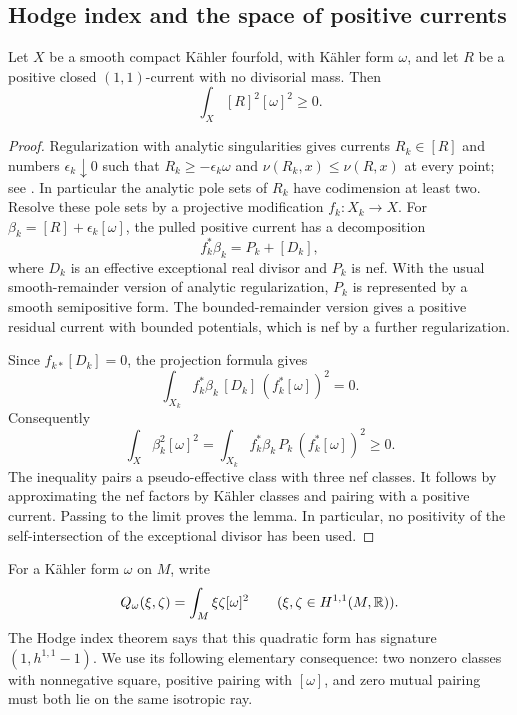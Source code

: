 \subsection{Hodge index and the space of positive currents}

\begin{lemma}\label{fol:nonnegative-square}
Let $X$ be a smooth compact K\"ahler fourfold, with K\"ahler form
$\omega$, and let $R$ be a positive closed $(1,1)$-current with no
divisorial mass.  Then
\[
 \int_X [R]^2[\omega]^2\geq0.
\]
\end{lemma}

\begin{proof}
Regularization with analytic singularities gives currents
$R_k\in[R]$ and numbers $\epsilon_k\downarrow0$ such that
$R_k\geq-\epsilon_k\omega$ and
$\nu(R_k,x)\leq\nu(R,x)$ at every point; see
\cite[Theorem~2.1(ii)]{BoucksomDivisorialZariski}.
In particular the analytic pole sets of $R_k$ have codimension at least
two.  Resolve these pole sets by a projective modification
$f_k\colon X_k\to X$.  For
$\beta_k=[R]+\epsilon_k[\omega]$, the pulled positive current has a
decomposition
\[
 f_k^*\beta_k=P_k+[D_k],
\]
where $D_k$ is an effective exceptional real divisor and $P_k$ is nef.
With the usual smooth-remainder version of analytic regularization,
$P_k$ is represented by a smooth semipositive form.  The
bounded-remainder version gives a positive residual current with bounded
potentials, which is nef by a further regularization.

Since $f_{k*}[D_k]=0$, the projection formula gives
\[
 \int_{X_k} f_k^*\beta_k\,[D_k]\,(f_k^*[\omega])^2=0.
\]
Consequently
\begin{equation}\label{fol:square-resolution}
 \int_X\beta_k^2[\omega]^2
 =
 \int_{X_k} f_k^*\beta_k\,P_k\,(f_k^*[\omega])^2
 \geq0.
\end{equation}
The inequality pairs a pseudo-effective class with three nef classes.
It follows by approximating the nef factors by K\"ahler classes and
pairing with a positive current.  Passing to the limit proves the lemma.
In particular, no positivity of the self-intersection of the
exceptional divisor has been used.
\end{proof}

For a K\"ahler form $\omega$ on $M$, write
\[
 Q_\omega(\xi,\zeta)=\int_M\xi\zeta[\omega]^2
 \qquad(\xi,\zeta\in H^{1,1}(M,\mathbb{R})).
\]
The Hodge index theorem says that this quadratic form has signature
$(1,h^{1,1}-1)$.  We use its following elementary consequence:
two nonzero classes with nonnegative square, positive pairing with
$[\omega]$, and zero mutual pairing must both lie on the same isotropic
ray.


